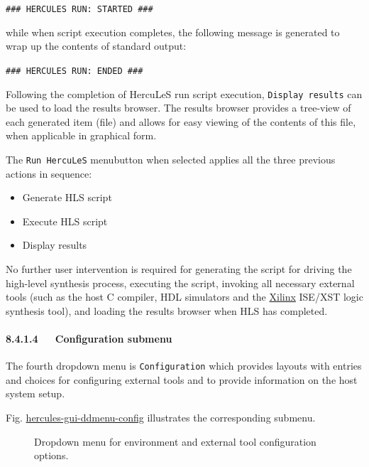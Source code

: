 \documentclass[a4paper]{article}
\newenvironment{DUlineblock}[1]{%
    \list{}{\setlength{\partopsep}{\parskip}
            \addtolength{\partopsep}{\baselineskip}
            \setlength{\topsep}{0pt}
            \setlength{\itemsep}{0.15\baselineskip}
            \setlength{\parsep}{0pt}
            \setlength{\leftmargin}{#1}}
    \raggedright
  }
  {\endlist}
\begin{document}
\begin{DUlineblock}{0em}
\item[] \texttt{\#\#\# HERCULES RUN: STARTED \#\#\#}
\end{DUlineblock}

while when script execution completes, the following message is generated to wrap up the contents of standard output:

\begin{DUlineblock}{0em}
\item[] \texttt{\#\#\# HERCULES RUN: ENDED \#\#\#}
\end{DUlineblock}

Following the completion of HercuLeS run script execution, \texttt{Display results} can be used to load the results browser. The results browser provides a tree-view of each generated item (file) and allows for easy viewing of the contents of this file, when applicable in graphical form.

The \texttt{Run HercuLeS} menubutton when selected applies all the three previous actions in sequence:
%
\begin{itemize}

\item Generate HLS script

\item Execute HLS script

\item Display results

\end{itemize}

No further user intervention is required for generating the script for driving the high-level synthesis process, executing the script, invoking all necessary external tools (such as the host C compiler, HDL simulators and the \href{http://www.xilinx.com}{Xilinx} ISE/XST logic synthesis tool), and loading the results browser when HLS has completed.


\paragraph{8.4.1.4~~~Configuration submenu%
  \label{configuration-submenu}%
}

The fourth dropdown menu is \texttt{Configuration} which provides layouts with entries and choices for configuring external tools and to provide information on the host system setup.

Fig. \hyperref[hercules-gui-ddmenu-config]{hercules-gui-ddmenu-config} illustrates the corresponding submenu.
\begin{figure}
\label{hercules-gui-ddmenu-config}
\noindent{}
\caption{Dropdown menu for environment and external tool configuration options.}
\end{figure}
\end{document}

